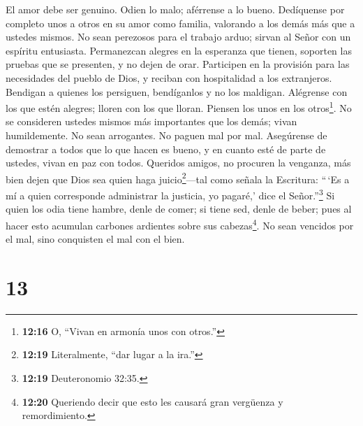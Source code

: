  El amor debe ser genuino. Odien lo malo; aférrense a lo
bueno.  Dedíquense por completo unos a otros en su amor
como familia, valorando a los demás más que a ustedes mismos.
 No sean perezosos para el trabajo arduo; sirvan al Señor
con un espíritu entusiasta.  Permanezcan alegres en la
esperanza que tienen, soporten las pruebas que se presenten, y no dejen
de orar.  Participen en la provisión para las necesidades
del pueblo de Dios, y reciban con hospitalidad a los extranjeros.
 Bendigan a quienes los persiguen, bendíganlos y no los
maldigan.  Alégrense con los que estén alegres; lloren con
los que lloran.  Piensen los unos en los otros\footnote{\textbf{12:16}
  O, ``Vivan en armonía unos con otros.''}. No se consideren ustedes
mismos más importantes que los demás; vivan humildemente. No sean
arrogantes.  No paguen mal por mal. Asegúrense de demostrar
a todos que lo que hacen es bueno,  y en cuanto esté de
parte de ustedes, vivan en paz con todos.  Queridos amigos,
no procuren la venganza, más bien dejen que Dios sea quien haga
juicio\footnote{\textbf{12:19} Literalmente, ``dar lugar a la ira.''}---tal
como señala la Escritura: ``\,`Es a mí a quien corresponde administrar
la justicia, yo pagaré,' dice el Señor.''\footnote{\textbf{12:19}
  Deuteronomio 32:35.}  Si quien los odia tiene hambre,
denle de comer; si tiene sed, denle de beber; pues al hacer esto
acumulan carbones ardientes sobre sus cabezas\footnote{\textbf{12:20}
  Queriendo decir que esto les causará gran vergüenza y remordimiento.}.
 No sean vencidos por el mal, sino conquisten el mal con el
bien.

\hypertarget{section-12}{%
\section{13}\label{section-12}}

